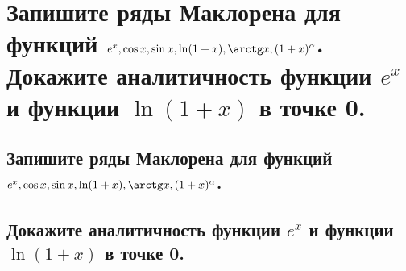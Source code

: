 \section{Запишите ряды Маклорена для функций $e^x, \cos x, \sin x, \ln(1+x), \arctg x, (1 + x)^\alpha$. Докажите аналитичность функции $e^x$ и функции $\ln (1+x)$ в точке 0.}

\subsection{Запишите ряды Маклорена для функций $e^x, \cos x, \sin x, \ln(1+x), \arctg x, (1 + x)^\alpha$.}

\subsection{Докажите аналитичность функции $e^x$ и функции $\ln (1+x)$ в точке 0.}